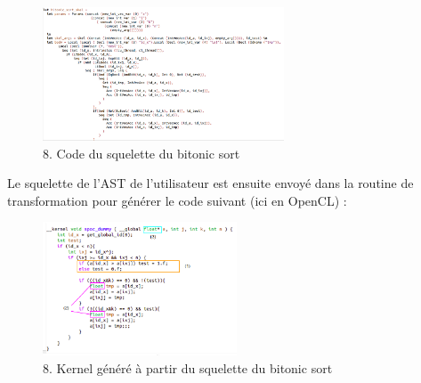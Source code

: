 \documentclass{report}
\begin{document}
\begin{itemize}
\begin{figure}[!h]
\begin{center}
\includegraphics[height=150]{images_finales/skel_sort.png}
\end{center}
\caption{8. Code du squelette du bitonic sort}
\label{test}
\end{figure} \newline

Le squelette de l'AST de l'utilisateur est ensuite envoyé dans la routine de transformation pour générer le code suivant (ici en OpenCL) : 

\begin{figure}[!h]
\begin{center}
\includegraphics[height=150]{images_finales/kernel_sort.png}
\end{center}
\caption{8. Kernel généré à partir du squelette du bitonic sort}
\label{test}
\end{figure} \newline


\end{itemize}
\end{document}
